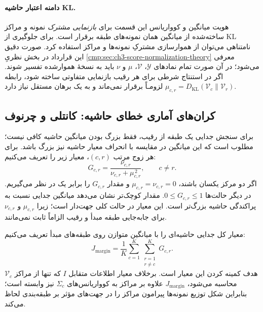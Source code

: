 \paragraph{دامنه اعتبار حاشیه KL.}
هویت میانگین و کوواریانس این قسمت
برای \emph{بازنمایی مشترک} نمونه
و مراکز ساخته‌شده از میانگین
همان نمونه‌های طبقه برقرار است.
برای جلوگیری از KL نامتناهی
می‌توان از هموارسازی مشترکِ نمونه‌ها و مراکز
استفاده کرد. صورت دقیق این قرارداد
در بخش نظریِ
\ref{cmp:sec:ch3-score-normalization-theory}
معرفی می‌شود؛ در آن صورت تمام
نمادهای $\mathscr Y$،
$\mathcal V$، $\mu$ و $\nu$ باید
به نسخهٔ هموارشده تفسیر شوند.
اگر در استنتاج شرطی برای هر رقیب
بازنمایی متفاوتی ساخته شود،
رابطه $\mu_{c,r}
=D_{\mathrm{KL}}(\mathcal V_c\|\mathcal V_r)$
لزومـاً برقرار نمی‌ماند
و به یک برهان مستقل نیاز دارد.




\subsection{کران‌های آماری خطای حاشیه: کانتلی و چرنوف}
\label{cmp:subsec:ch3-margin-criterion}
برای سنجش جدایی یک طبقه از رقیب، فقط بزرگ بودن میانگین حاشیه کافی نیست؛ مطلوب است که این میانگین در مقایسه با انحراف معیار حاشیه نیز بزرگ باشد. برای هر زوج مرتب $(c,r)$، معیار زیر را تعریف می‌کنیم:
\begin{equation}\label{cmp:eq:ch3-margin-pairwise}
\boxed{
G_{c,r}=\frac{\nu_{c,r}}{\nu_{c,r}+\mu_{c,r}^{\,2}},
\qquad c\ne r.}
\end{equation}
اگر دو مرکز یکسان باشند، $\mu_{c,r}=\nu_{c,r}=0$ و مقدار $G_{c,r}$ را برابر یک در نظر می‌گیریم. در دیگر حالت‌ها $0\le G_{c,r}\le1$. مقدار کوچک‌تر نشان می‌دهد میانگین جدایی نسبت به پراکندگی حاشیه بزرگ‌تر است. این معیار در حالت کلی جهت‌دار است؛ زیرا $\mu_{c,r}$ و $\nu_{c,r}$ برای جابه‌جایی طبقه مبدأ و رقیب الزاماً ثابت نمی‌مانند.

معیار کل جدایی حاشیه‌ای را با میانگین متوازن روی طبقه‌های مبدأ تعریف می‌کنیم:
\begin{equation}\label{cmp:eq:ch3-margin-criterion}
\boxed{
J_{\mathrm{margin}}
=\frac1K\sum_{c=1}^{K}\sum_{\substack{r=1\\r\ne c}}^{K}
G_{c,r}.}
\end{equation}
هدف کمینه کردن این معیار است. برخلاف معیار اطلاعات متقابل $I$ که تنها از مراکز $\mathcal V_c$ محاسبه می‌شود، $J_{\mathrm{margin}}$ علاوه بر مراکز به کوواریانس‌های $\Sigma_c$ نیز وابسته است؛ بنابراین شکل توزیع نمونه‌ها پیرامون مراکز را در جهت‌های مؤثر بر طبقه‌بندی لحاظ می‌کند.

